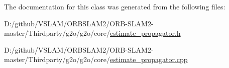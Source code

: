 The documentation for this class was generated from the following files\+:\begin{DoxyCompactItemize}
\item 
D\+:/github/\+V\+S\+L\+A\+M/\+O\+R\+B\+S\+L\+A\+M2/\+O\+R\+B-\/\+S\+L\+A\+M2-\/master/\+Thirdparty/g2o/g2o/core/\mbox{\hyperlink{estimate__propagator_8h}{estimate\+\_\+propagator.\+h}}\item 
D\+:/github/\+V\+S\+L\+A\+M/\+O\+R\+B\+S\+L\+A\+M2/\+O\+R\+B-\/\+S\+L\+A\+M2-\/master/\+Thirdparty/g2o/g2o/core/\mbox{\hyperlink{estimate__propagator_8cpp}{estimate\+\_\+propagator.\+cpp}}\end{DoxyCompactItemize}
